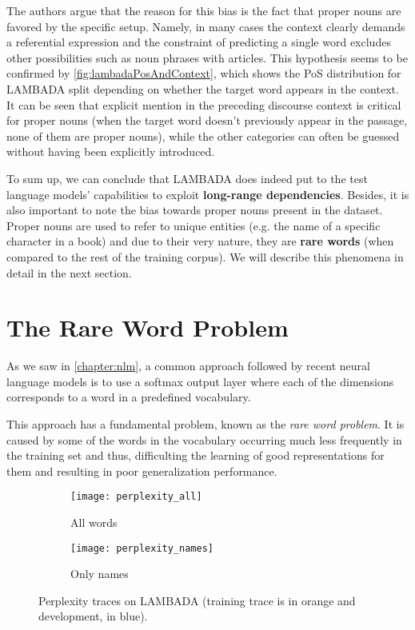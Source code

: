 The authors argue that the reason for this bias is the fact that proper nouns are favored by the specific setup. Namely, in many cases the context clearly demands a referential expression and the constraint of predicting a single word excludes other possibilities such as noun phrases with articles. This hypothesis seems to be confirmed by \autoref{fig:lambadaPosAndContext}, which shows the PoS distribution for LAMBADA split depending on whether the target word appears in the context. It can be seen that explicit mention in the preceding discourse context is critical for proper nouns (when the target word doesn't previously appear in the passage, none of them are proper nouns), while the other categories can often be guessed without having been explicitly introduced.

To sum up, we can conclude that LAMBADA does indeed put to the test language models' capabilities to exploit \textbf{long-range dependencies}. Besides, it is also important to note the bias towards proper nouns present in the dataset. Proper nouns are used to refer to unique entities (e.g. the name of a specific character in a book) and due to their very nature, they are \textbf{rare words} (when compared to the rest of the training corpus). We will describe this phenomena in detail in the next section.

\section{The Rare Word Problem}
\label{sec:problemRare}

As we saw in \autoref{chapter:nlm}, a common approach followed by recent neural language models is to use a softmax output layer where each of the dimensions corresponds to a word in a predefined vocabulary.

This approach has a fundamental problem, known as the \textit{rare word problem}. It is caused by some of the words in the vocabulary occurring much less frequently in the training set and thus, difficulting the learning of good representations for them and resulting in poor generalization performance. 

\begin{figure}[H]
	\centering
	\begin{subfigure}{.5\textwidth}
		\centering
		\texttt{[image: perplexity\_all]}
		\caption{All words}
		\label{fig:perplexity_all}
	\end{subfigure}%
	\begin{subfigure}{.5\textwidth}
		\centering
		\texttt{[image: perplexity\_names]}
		\caption{Only names}
		\label{fig:perplexity_names}
	\end{subfigure}
	\caption{Perplexity traces on LAMBADA (training trace is in orange and development, in blue).}
	\label{fig:perplexityRare}
\end{figure}

